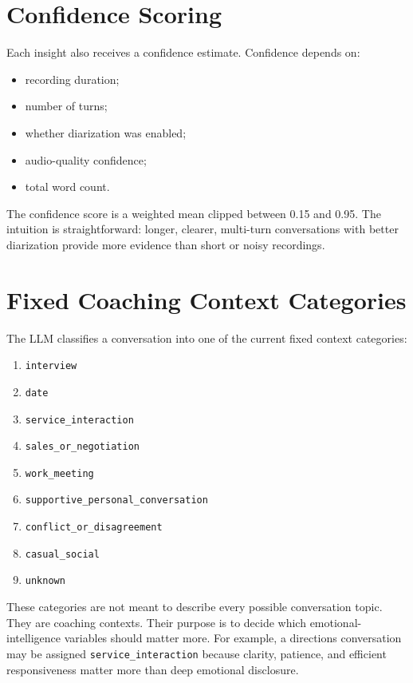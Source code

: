 \documentclass[11pt]{article}
\begin{document}
\section{Confidence Scoring}

Each insight also receives a confidence estimate. Confidence depends on:

\begin{itemize}[leftmargin=*]
  \item recording duration;
  \item number of turns;
  \item whether diarization was enabled;
  \item audio-quality confidence;
  \item total word count.
\end{itemize}

The confidence score is a weighted mean clipped between 0.15 and 0.95. The intuition is straightforward: longer, clearer, multi-turn conversations with better diarization provide more evidence than short or noisy recordings.

\section{Fixed Coaching Context Categories}

The LLM classifies a conversation into one of the current fixed context categories:

\begin{enumerate}[leftmargin=*]
  \item \texttt{interview}
  \item \texttt{date}
  \item \texttt{service\_interaction}
  \item \texttt{sales\_or\_negotiation}
  \item \texttt{work\_meeting}
  \item \texttt{supportive\_personal\_conversation}
  \item \texttt{conflict\_or\_disagreement}
  \item \texttt{casual\_social}
  \item \texttt{unknown}
\end{enumerate}

These categories are not meant to describe every possible conversation topic. They are coaching contexts. Their purpose is to decide which emotional-intelligence variables should matter more. For example, a directions conversation may be assigned \texttt{service\_interaction} because clarity, patience, and efficient responsiveness matter more than deep emotional disclosure.
\end{document}
